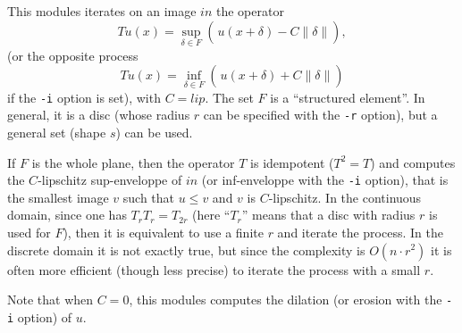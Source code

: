 This modules iterates on an image $in$ the operator
$$Tu(x) = \sup_{\delta \in F} \left( \frac{}{}
u(x+\delta)-C\|\delta\| \right),$$ 
(or the opposite process
$$Tu(x) = \inf_{\delta \in F} \left( \frac{}{}
u(x+\delta)+C\|\delta\| \right)$$
if the \verb+-i+ option is set), with $C=lip$.
The set $F$ is a ``structured element''. In general, it is a disc
(whose radius $r$ can be specified with the \verb+-r+ option), but
a general set (shape $s$) can be used.

\medskip

If $F$ is the whole plane, then the operator $T$ is idempotent 
($T^2=T$) and computes the $C$-lipschitz 
sup-enveloppe of $in$
(or inf-enveloppe with the \verb+-i+ option), that is the smallest
image $v$ such that $u\leq v$ and $v$ is $C$-lipschitz. In the
continuous domain, since one has $T_r T_r = T_{2r}$ (here
``$T_r$'' means that a disc with radius $r$ is used for $F$),
then it is equivalent to use a finite $r$ and iterate the process.
In the discrete domain it is not exactly true, but since the complexity
is $O(n\cdot r^2)$ it is often more efficient (though less precise)
to iterate the process with a small $r$.

\medskip

Note that when $C=0$, this modules computes the dilation (or erosion
with the \verb+-i+ option) of $u$.


